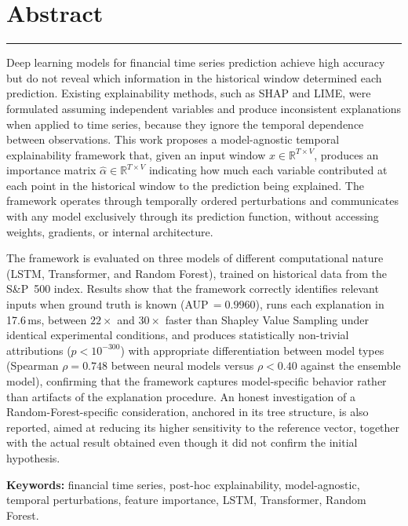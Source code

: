 \chapter*{Abstract}
\hrule \bigskip \vspace*{1cm}

Deep learning models for financial time series prediction achieve high accuracy but do not reveal which information in the historical window determined each prediction. Existing explainability methods, such as SHAP and LIME, were formulated assuming independent variables and produce inconsistent explanations when applied to time series, because they ignore the temporal dependence between observations. This work proposes a model-agnostic temporal explainability framework that, given an input window $x \in \mathbb{R}^{T \times V}$, produces an importance matrix $\hat{\alpha} \in \mathbb{R}^{T \times V}$ indicating how much each variable contributed at each point in the historical window to the prediction being explained. The framework operates through temporally ordered perturbations and communicates with any model exclusively through its prediction function, without accessing weights, gradients, or internal architecture.

The framework is evaluated on three models of different computational nature (LSTM, Transformer, and Random Forest), trained on historical data from the S\&P~500 index. Results show that the framework correctly identifies relevant inputs when ground truth is known (AUP\,$=0.9960$), runs each explanation in 17.6\,ms, between $22{\times}$ and $30{\times}$ faster than Shapley Value Sampling under identical experimental conditions, and produces statistically non-trivial attributions ($p<10^{-300}$) with appropriate differentiation between model types (Spearman $\rho=0.748$ between neural models versus $\rho<0.40$ against the ensemble model), confirming that the framework captures model-specific behavior rather than artifacts of the explanation procedure. An honest investigation of a Random-Forest-specific consideration, anchored in its tree structure, is also reported, aimed at reducing its higher sensitivity to the reference vector, together with the actual result obtained even though it did not confirm the initial hypothesis.

\bigskip
\noindent\textbf{Keywords:} financial time series, post-hoc explainability, model-agnostic, temporal perturbations, feature importance, LSTM, Transformer, Random Forest.
